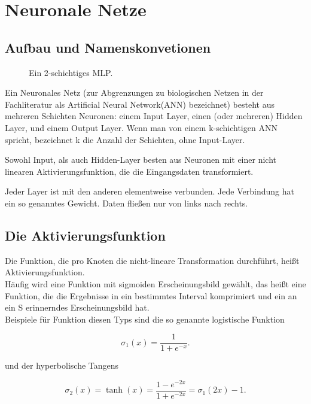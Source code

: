 \section{Neuronale Netze} %

\subsection{Aufbau und Namenskonvetionen}
\begin{figure}[ht!]
\label{fig:MLP}
  \centering
    
  \caption{Ein 2-schichtiges MLP.}
\end{figure}


Ein Neuronales Netz (zur Abgrenzungen zu biologischen Netzen in der Fachliteratur als Artificial Neural Network(ANN) bezeichnet) besteht aus mehreren Schichten Neuronen: einem Input Layer, einen (oder mehreren) Hidden Layer, und einem Output Layer. 
Wenn man von einem k-schichtigen ANN spricht, bezeichnet k die Anzahl der Schichten, ohne Input-Layer.

Sowohl Input, als auch Hidden-Layer besten aus Neuronen mit einer nicht linearen Aktivierungsfunktion, die die Eingangsdaten transformiert.

Jeder Layer ist mit den anderen elementweise verbunden. Jede Verbindung hat ein so genanntes Gewicht. Daten fließen nur von links nach rechts. 
 

\subsection{Die Aktivierungsfunktion}
Die Funktion, die pro Knoten die nicht-lineare Transformation durchführt, heißt Aktivierungsfunktion. \\
Häufig wird eine Funktion mit sigmoiden Erscheinungsbild gewählt, das heißt eine Funktion, die die Ergebnisse in ein bestimmtes Interval komprimiert und ein an ein S erinnerndes Erscheinungsbild hat. 
\\
Beispiele für Funktion diesen Typs sind die so genannte logistische Funktion

\begin{equation}
\sigma_1(x) = \frac{1}{1+e^{-x}}.
\end{equation}

und der hyperbolische Tangens

\begin{equation}
\sigma_2(x) = \tanh(x) = \frac{1-e^{-2x}}{1+e^{-2x}} = 
\sigma_1(2x) -1.
\end{equation}

